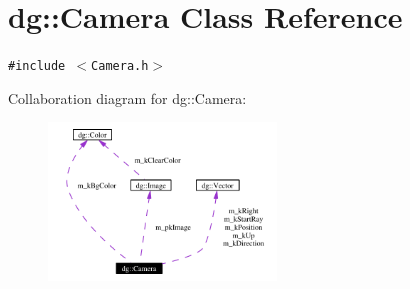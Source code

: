 \section{dg::Camera Class Reference}
\label{classdg_1_1Camera}
{\tt \#include $<$Camera.h$>$}

Collaboration diagram for dg::Camera:\begin{figure}[H]
\begin{center}
\leavevmode
\includegraphics[width=172pt]{classdg_1_1Camera__coll__graph}
\end{center}
\end{figure}
